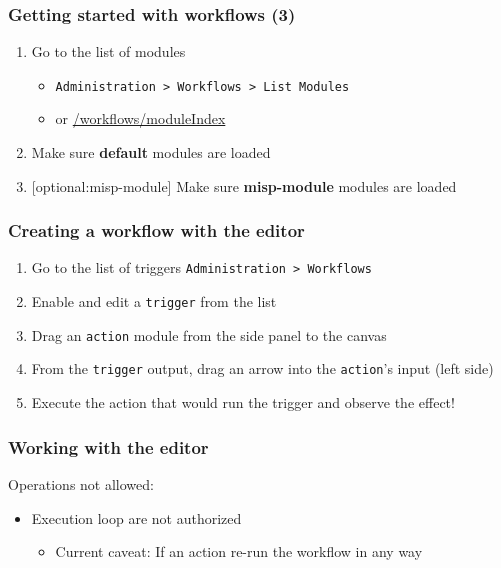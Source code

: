 \begin{frame}
    \frametitle{Getting started with workflows (3)}
    \begin{enumerate}
        \item Go to the list of modules
        \begin{itemize}
            \item \texttt{Administration > Workflows > List Modules}
            \item or \url{/workflows/moduleIndex}
        \end{itemize}
        \item Make sure \textbf{default} modules are loaded
        \item {[optional:misp-module]} Make sure \textbf{misp-module} modules are loaded
    \end{enumerate}
\end{frame}

\begin{frame}
    \frametitle{Creating a workflow with the editor}
    \begin{enumerate}
        \item Go to the list of triggers \texttt{Administration > Workflows}
        \item Enable and edit a \texttt{trigger} from the list
        \item Drag an \texttt{action} module from the side panel to the canvas
        \item From the \texttt{trigger} output, drag an arrow into the \texttt{action}'s input (left side)
        \item Execute the action that would run the trigger and observe the effect!
    \end{enumerate}
    \begin{center}
    \end{center}
    \begin{center}
    \end{center}
\end{frame}

\begin{frame}
    \frametitle{Working with the editor}
    Operations not allowed:
    \begin{itemize}
        \item Execution loop are not authorized
        \begin{itemize}
            \item Current caveat: If an action re-run the workflow in any way
        \end{itemize}
    \end{itemize}
    \begin{center}
    \end{center}
\end{frame}

